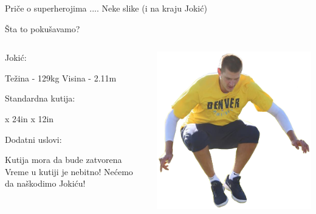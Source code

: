 \documentclass{beamer}
\begin{document}
    \begin{frame}{Priče o superherojima}
        .... Neke slike (i na kraju Jokić)
    \end{frame}
    \begin{frame}{Šta to pokušavamo?}
        \begin{columns}
        \begin{column}{0.5\textwidth}
            Jokić: \begin{itemize}
                \itemR Težina - 129kg
                \itemR Visina - 2.11m
            \end{itemize}
            Standardna kutija: \begin{itemize}
                \itemR 24in x 24in x 12in
            \end{itemize}
            Dodatni uslovi: \begin{itemize}
                \itemR Kutija mora da bude zatvorena
                \itemR Vreme u kutiji je nebitno!
                \itemR Nećemo da naškodimo Jokiću!
            \end{itemize}
        \end{column}
        \begin{column}{0.5\textwidth}
            \includegraphics[height=0.4\textheight]{Jokic/Jokic_skok} \\

\end{column}
\end{columns}
\end{frame}
\end{document}
